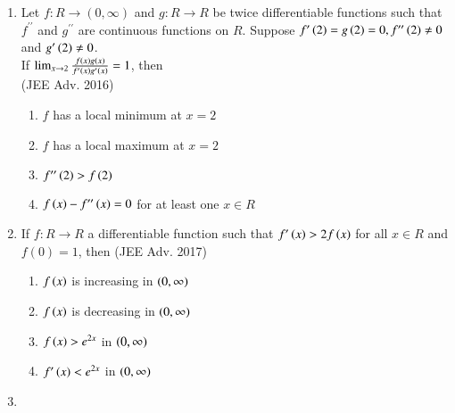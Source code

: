 \documentclass[journal]{IEEEtran}
\begin{document}
\begin{enumerate}
{        }
    \item{
        
            Let $f: R\rightarrow (0,\infty)$ and $g: R\rightarrow R$ be twice differentiable functions such that $f^{\prime\prime}$ and $g^{\prime\prime}$ are continuous functions on $R$. Suppose $f^{\prime}\left(2\right) = g\left(2\right)=0, f^{\prime\prime}\left(2\right) \neq0$ and $g^{\prime}\left(2\right)\neq0$.\\[6pt] If $\lim_{x\to2}  \frac{f\left(x\right)g\left(x\right)}{f^{\prime}\left(x\right)g^{\prime}\left(x\right)} = 1$, then \\
             \text{  }\hfill
                {(JEE Adv. 2016)}
            \begin{multicols}{2}
                \begin{enumerate}
                    \item $f$ has a local minimum at $x=2$
                    \item $f$ has a local maximum at $x=2$
                    \item $f^{\prime\prime}\left(2\right)>f\left(2\right)$
                    \item $f\left(x\right) - f^{\prime\prime}\left(x\right) = 0$ for at least one $x\in R$
                \end{enumerate}
            \end{multicols}
        
        }
    \item{
        
            If $f: R\rightarrow R$ a differentiable function such that $f^{\prime}\left(x\right)>2f\left(x\right)$ for all $x \in R$ and $f(0) = 1$, then
             \text{   }\hfill
                {(JEE Adv. 2017)}
            \begin{multicols}{2}
                \begin{enumerate}
                    \item $f\left(x\right)$ is increasing in $\left(0,\infty\right)$
                    \item $f\left(x\right)$ is decreasing in $\left(0,\infty\right)$
                    \item $f\left(x\right)>e^{2x}$ in $\left(0,\infty\right)$
                    \item $f^{\prime}\left(x\right)<e^{2x}$ in $\left(0,\infty\right)$
                \end{enumerate}
            \end{multicols}
        
        }
    \item{
        
}
\end{enumerate}
\end{document}
